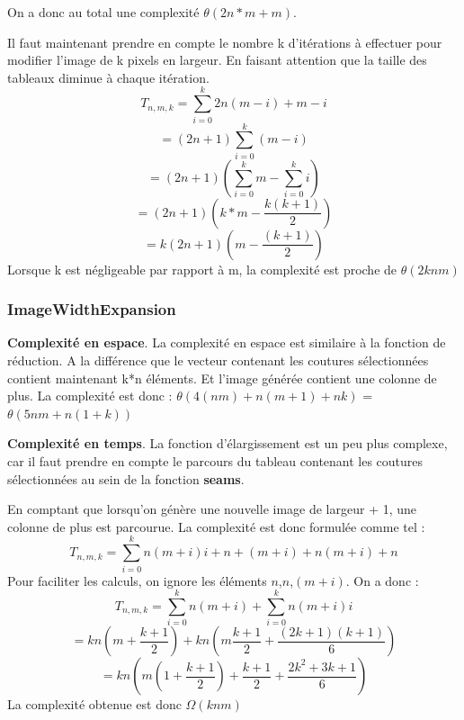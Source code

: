 \documentclass[10pt]{article}
\begin{document}
On a donc au total une complexité $\theta(2n*m + m)$.

 Il faut maintenant prendre en compte le nombre k d'itérations à effectuer pour modifier l'image de k pixels en largeur. En faisant attention que la taille des tableaux diminue à chaque itération.
$$
 	T_{n,m,k} = \sum\limits_{i=0}^{k} 2n(m-i) + m-i 
$$
$$
 	= (2n + 1)\sum\limits_{i=0}^{k} (m -i)
$$
$$
 	= (2n + 1)(\sum\limits_{i=0}^{k} m - \sum\limits_{i=0}^{k} i)
$$
$$
 	= (2n + 1)(k*m - \frac{k(k+1)}{2})
$$
$$
 	= k(2n + 1)(m - \frac{(k+1)}{2})
$$
Lorsque k est négligeable par rapport à m, la complexité est proche de $\theta(2knm)$\\
\subsubsection{ImageWidthExpansion}
\textbf{Complexité en espace}. La complexité en espace est similaire à la fonction de réduction. A la différence que le vecteur contenant les coutures sélectionnées contient maintenant k*n éléments. Et l'image générée contient une colonne de plus. La complexité est donc :  $\theta(4(nm) + n(m+1) + nk)$ = $\theta(5nm + n(1 + k))$

\textbf{Complexité en temps}.
La fonction d'élargissement est un peu plus complexe, car il faut prendre en compte le parcours du tableau contenant les coutures sélectionnées au sein de la fonction \textbf{seams}.

En comptant que lorsqu'on génère une nouvelle image de largeur + 1, une colonne de plus est parcourue. La complexité est donc formulée comme tel :
$$
 	T_{n,m,k} = \sum\limits_{i=0}^{k} n(m+i)i + n + (m+i) + n(m+i) + n 
$$
Pour faciliter les calculs, on ignore les éléments $n$,$n$,$(m+i)$. On a donc :
$$
 	T_{n,m,k} = \sum\limits_{i=0}^{k} n(m+i) + \sum\limits_{i=0}^{k} n(m+i)i 
$$
$$
 	= kn(m + \frac{k + 1}{2}) + kn(m\frac{k + 1}{2} + \frac{(2k + 1)(k + 1)}{6})
$$
$$
 	= kn(m(1 + \frac{k + 1}{2}) + \frac{k + 1}{2} + \frac{2k^2 + 3k + 1}{6})
$$
La complexité obtenue est donc $\Omega(knm)$
\end{document}
